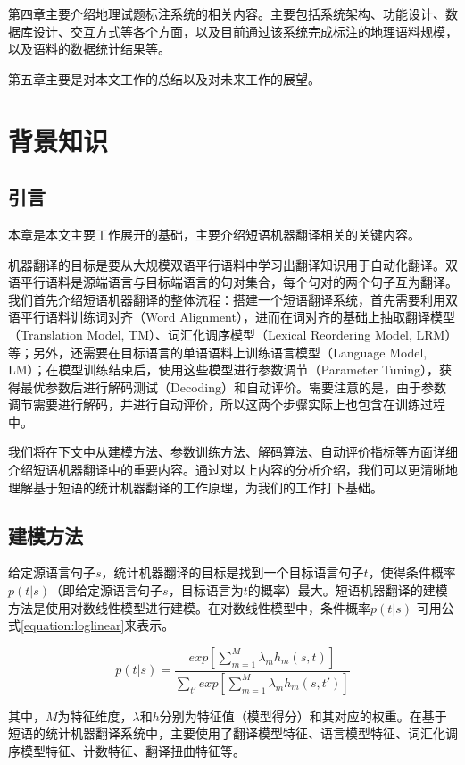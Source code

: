 \documentclass[master, winfont]{njuthesis}
\begin{document}
第四章主要介绍地理试题标注系统的相关内容。主要包括系统架构、功能设计、数据库设计、交互方式等各个方面，以及目前通过该系统完成标注的地理语料规模，以及语料的数据统计结果等。

第五章主要是对本文工作的总结以及对未来工作的展望。

\chapter{背景知识}
\section{引言}
本章是本文主要工作展开的基础，主要介绍短语机器翻译相关的关键内容。

机器翻译的目标是要从大规模双语平行语料中学习出翻译知识用于自动化翻译。双语平行语料是源端语言与目标端语言的句对集合，每个句对的两个句子互为翻译。我们首先介绍短语机器翻译的整体流程：搭建一个短语翻译系统，首先需要利用双语平行语料训练词对齐（Word Alignment），进而在词对齐的基础上抽取翻译模型（Translation Model, TM）、词汇化调序模型（Lexical Reordering Model, LRM）等；另外，还需要在目标语言的单语语料上训练语言模型（Language Model, LM）；在模型训练结束后，使用这些模型进行参数调节（Parameter Tuning），获得最优参数后进行解码测试（Decoding）和自动评价。需要注意的是，由于参数调节需要进行解码，并进行自动评价，所以这两个步骤实际上也包含在训练过程中。

我们将在下文中从建模方法、参数训练方法、解码算法、自动评价指标等方面详细介绍短语机器翻译中的重要内容。通过对以上内容的分析介绍，我们可以更清晰地理解基于短语的统计机器翻译的工作原理，为我们的工作打下基础。

\section{建模方法}\label{section:modeling}
给定源语言句子$s$，统计机器翻译的目标是找到一个目标语言句子$t$，使得条件概率$p(t|s)$（即给定源语言句子$s$，目标语言为$t$的概率）最大。短语机器翻译的建模方法是使用对数线性模型进行建模\cite{och2002discriminative}。在对数线性模型中，条件概率$p(t|s)$ 可用公式\ref{equation:loglinear}来表示。

\begin{equation}
  \label{equation:loglinear}
    p(t|s) = \frac{exp[\sum_{m=1}^M \lambda_mh_m(s, t)]}{\sum_{t'}exp[\sum_{m=1}^M\lambda_mh_m(s, t')]}
\end{equation}

其中，$M$为特征维度，$\lambda$和$h$分别为特征值（模型得分）和其对应的权重。在基于短语的统计机器翻译系统中，主要使用了翻译模型特征、语言模型特征、词汇化调序模型特征、计数特征、翻译扭曲特征等。
\end{document}
